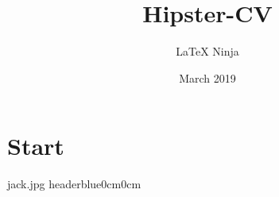 \documentclass[darkhipster]{hipstercv}
\title{Hipster-CV}
\author{\LaTeX{} Ninja}
\date{March 2019}
\begin{document}
\thispagestyle{empty}

\section*{Start}



{{\large}}
{jack.jpg}
{headerblue}{0cm}{0cm}




\subsection*{}
\vspace{4em}
\end{document}

